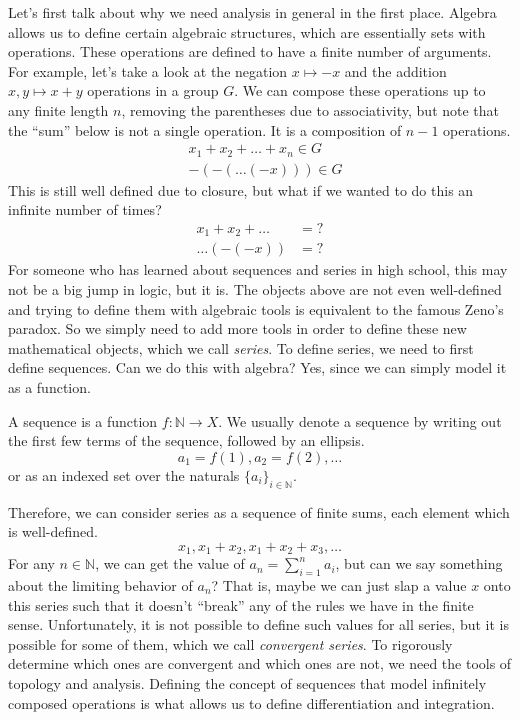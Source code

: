 Let's first talk about why we need analysis in general in the first place. Algebra allows us to define certain algebraic structures, which are essentially sets with operations. These operations are defined to have a finite number of arguments. For example, let's take a look at the negation $x \mapsto -x$ and the addition $x, y \mapsto x + y$ operations in a group $G$. We can compose these operations up to any finite length $n$, removing the parentheses due to associativity, but note that the ``sum'' below is not a single operation. It is a composition of $n-1$ operations. 
\begin{align}
  & x_1 + x_2 + \ldots + x_n \in G  \\
  & -(-(\ldots(-x))) \in G
\end{align} 
This is still well defined due to closure, but what if we wanted to do this an infinite number of times? 
\begin{align}
  x_1 + x_2 + \ldots & = ? \\
  \ldots(-(-x)) & = ? 
\end{align} 
For someone who has learned about sequences and series in high school, this may not be a big jump in logic, but it is. The objects above are not even well-defined and trying to define them with algebraic tools is equivalent to the famous Zeno's paradox. So we simply need to add more tools in order to define these new mathematical objects, which we call \textit{series}. To define series, we need to first define sequences. Can we do this with algebra? Yes, since we can simply model it as a function. 

\begin{definition}[Sequence]
  A sequence is a function $f: \mathbb{N} \rightarrow X$. We usually denote a sequence by writing out the first few terms of the sequence, followed by an ellipsis. 
  \begin{equation}
    a_1 = f(1), a_2 = f(2), \ldots
  \end{equation}
  or as an indexed set over the naturals $\{a_i\}_{i \in \mathbb{N}}$. 
\end{definition}

Therefore, we can consider series as a sequence of finite sums, each element which is well-defined. 
\begin{equation}
  x_1, x_1 + x_2, x_1 + x_2 + x_3, \ldots
\end{equation} 
For any $n \in \mathbb{N}$, we can get the value of $a_n = \sum_{i=1}^n a_i$, but can we say something about the limiting behavior of $a_n$? That is, maybe we can just slap a value $x$ onto this series such that it doesn't ``break'' any of the rules we have in the finite sense. Unfortunately, it is not possible to define such values for all series, but it is possible for some of them, which we call \textit{convergent series}. To rigorously determine which ones are convergent and which ones are not, we need the tools of topology and analysis. Defining the concept of sequences that model infinitely composed operations is what allows us to define differentiation and integration. 


